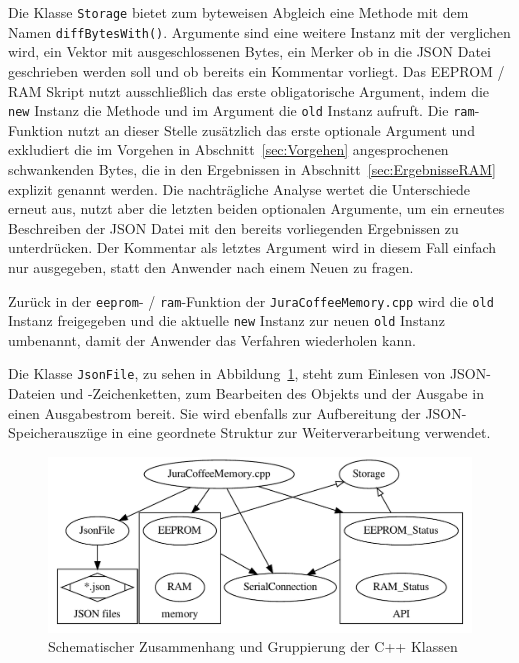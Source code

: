 Die Klasse \texttt{Storage} bietet zum byteweisen Abgleich eine Methode mit dem Namen \texttt{diffBytesWith()}.
Argumente sind eine weitere Instanz mit der verglichen wird, ein Vektor mit ausgeschlossenen Bytes, ein Merker ob in die \ac{JSON} Datei geschrieben werden soll und ob bereits ein Kommentar vorliegt.
Das \ac{EEPROM} / \ac{RAM} Skript nutzt ausschließlich das erste obligatorische Argument, indem die \texttt{new} Instanz die Methode und im Argument die \texttt{old} Instanz aufruft.
Die \texttt{ram}-Funktion nutzt an dieser Stelle zusätzlich das erste optionale Argument und exkludiert die im Vorgehen in Abschnitt~\ref{sec:Vorgehen} angesprochenen schwankenden Bytes, die in den Ergebnissen in Abschnitt~\ref{sec:ErgebnisseRAM} explizit genannt werden.
Die nachträgliche Analyse wertet die Unterschiede erneut aus, nutzt aber die letzten beiden optionalen Argumente, um ein erneutes Beschreiben der \ac{JSON} Datei mit den bereits vorliegenden Ergebnissen zu unterdrücken.
Der Kommentar als letztes Argument wird in diesem Fall einfach nur ausgegeben, statt den Anwender nach einem Neuen zu fragen.

Zurück in der \texttt{eeprom}- / \texttt{ram}-Funktion der \texttt{JuraCoffeeMemory.cpp} wird die \texttt{old} Instanz freigegeben und die aktuelle \texttt{new} Instanz zur neuen \texttt{old} Instanz umbenannt, damit der Anwender das Verfahren wiederholen kann.

Die Klasse \texttt{JsonFile}, zu sehen in Abbildung~\ref{fig:storage_inherit_graph}, steht zum Einlesen von \ac{JSON}-Dateien und -Zeichenketten, zum Bearbeiten des Objekts und der Ausgabe in einen Ausgabestrom bereit.
Sie wird ebenfalls zur Aufbereitung der \ac{JSON}-Speicherauszüge in eine geordnete Struktur zur Weiterverarbeitung verwendet.

\begin{figure}
  \begin{center}
    \includegraphics[scale=0.74]{images/chapter_4/class-structure}
    \caption{Schematischer Zusammenhang und Gruppierung der C++ Klassen}
    \label{fig:storage_inherit_graph}
  \end{center}
\end{figure}

